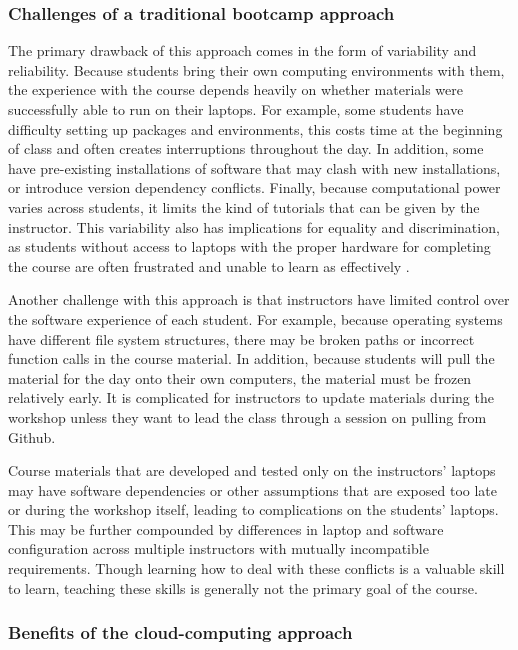 \subsubsection{Challenges of a traditional bootcamp approach}

The primary drawback of this approach comes in the form of variability and
reliability. Because students bring their own computing environments with them,
the experience with the course depends heavily on whether materials were
successfully able to run on their laptops. For example, some students have
difficulty setting up packages and environments, this costs time at the
beginning of class and often creates interruptions throughout the day. In
addition, some have pre-existing installations of software that may clash with
new installations, or introduce version dependency conflicts. Finally, because
computational power varies across students, it limits the kind of tutorials that
can be given by the instructor. This variability also has
implications for equality and discrimination, as students without access to
laptops with the proper hardware for completing the course are often frustrated
and unable to learn as effectively \cite{clark-proc-scipy-2014}.

Another challenge with this approach is that instructors have limited control
over the software experience of each student. For example, because operating
systems have different file system structures, there may be broken paths or
incorrect function calls in the course material. In addition, because students
will pull the material for the day onto their own computers, the material must
be frozen relatively early. It is complicated for instructors to update
materials during the workshop unless they want to lead the class through a
session on pulling from Github.

Course materials that are developed and tested only on the instructors' laptops
may have software dependencies or other assumptions that are exposed too late or
during the workshop itself, leading to complications on the students'
laptops. This may be further compounded by differences in laptop and software
configuration across multiple instructors with mutually incompatible
requirements. Though learning how to deal with these conflicts is a valuable
skill to learn, teaching these skills is generally not the primary goal of
the course.

\subsubsection{Benefits of the cloud-computing approach}

